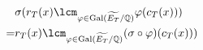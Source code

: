 \documentclass[preview]{standalone}
\begin{document}
\begin{center}
\begin{align*} &\sigma(r_T(x) \lcm_{\varphi \in \text{Gal}(\widetilde{E_T}/\mathbb{Q})} \varphi(c_T(x))) \\ = & r_T(x)\lcm_{\varphi \in \text{Gal}(\widetilde{E_T}/\mathbb{Q})} (\sigma \circ \varphi)(c_T(x)))  \end{align*}
\end{center}
\end{document}
